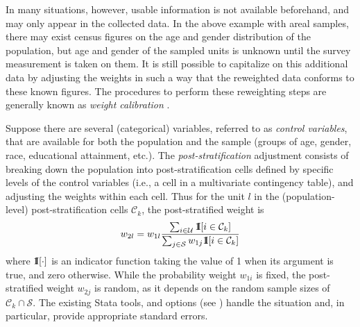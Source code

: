 In many situations, however, usable information is not available beforehand,
and may only appear in the collected data. In the above example with
areal samples, there may exist census figures on the age and gender
distribution of the population, but age and gender of the sampled units
is unknown until the survey measurement is taken on them.
It is still possible to capitalize on this additional data by
adjusting the weights in such a way that the reweighted data
conforms to these known figures. The procedures to perform these
reweighting steps are generally known as {\it weight calibration}
\citep{deville:sarndal:1992,deville:sarndal:sautory:1993,kott:2006,kott:2009,sarndal:2007}.

Suppose there are several (categorical) variables, referred to
as {\it control variables}, that are available for both
the population and the sample
(groups of age, gender, race, educational attainment, etc.).
The {\it post-stratification} adjustment consists of breaking down
the population into post-stratification cells defined
by specific levels of the control variables (i.e., a cell in a multivariate
contingency table), and adjusting the weights within each cell.
Thus for the unit $l$ in the (population-level) post-stratification cells $\mathcal{C}_k$, the post-stratified weight is
\begin{equation}
   w_{2l} = w_{1l} \frac%
        {\sum_{i \in \mathcal{U}} \One[i \in \mathcal{C}_k]}%
        {\sum_{j \in \mathcal{S}} w_{1j} \One[i \in \mathcal{C}_k]}%
   \label{eq:ps:weight}
\end{equation}
where ${\rm 1\kern-.3em I}[\cdot]$ is an indicator function taking the value of 1
when its argument is true, and zero otherwise.
While the probability weight $w_{1i}$ is fixed, the post-stratified weight
$w_{2j}$ is random, as it depends on the random sample sizes of
$\mathcal{C}_k \cap \mathcal{S}$.
The existing Stata tools,  and 
options (see ) handle the situation and,
in particular, provide appropriate standard errors.

